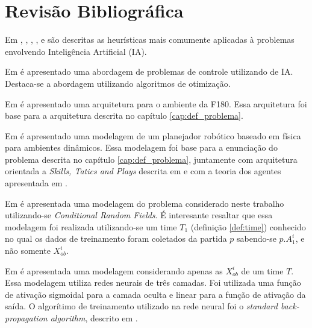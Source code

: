 \chapter{Revisão Bibliográfica}\label{cap:rev_bibliografica}


Em \cite{russellnorvig}, \cite{passos2005datamining}, \cite{kosko1997fuzzy}, \cite{haykin2001redes},
\cite{doringo2004ant} e \cite{bertsimas1993simulated} são descritas as heurísticas
mais comumente aplicadas à problemas envolvendo Inteligência Artificial (IA).

Em \cite{yoneyama2004ia} é apresentado uma abordagem de problemas de controle utilizando de IA. Destaca-se
a abordagem utilizando algoritmos de otimização.

Em \cite{felixnavarro} é apresentado uma arquitetura para o ambiente da F180. Essa arquitetura foi base
para a arquitetura descrita no capítulo \ref{cap:def_problema}.

Em \cite{zickler} é apresentado uma modelagem de um planejador robótico baseado em física para ambientes dinâmicos. 
Essa modelagem foi base para a enunciação do problema descrita no capítulo \ref{cap:def_problema}, juntamente com 
arquitetura orientada a \textit{Skills, Tatics and Plays} descrita em \cite{bowling2003plays} e com a teoria dos 
agentes apresentada em \cite{russellnorvig}.

Em \cite{vail2008crf} é apresentada uma modelagem do problema considerado neste trabalho
utilizando-se \textit{Conditional Random Fields}. É interesante resaltar que essa modelagem
foi realizada utilizando-se um time $T_1$ (definição \ref{def:time}) conhecido no qual os dados
de treinamento foram coletados da partida $p$ sabendo-se $p.A_1^{i}$, e não somente $X_{ob}^{i}$.

Em \cite{sheng2005motionprediction} é apresentada uma modelagem considerando apenas as $X_{ob}^{i}$
de um time $T$. Essa modelagem utiliza redes neurais de três camadas. Foi utilizada
uma função de ativação sigmoidal para a camada oculta e linear para a função de 
ativação da saída. O algorítimo de treinamento utilizado na rede neural foi o \textit{standard back-propagation
algorithm}, descrito em \cite{haykin2001redes}.